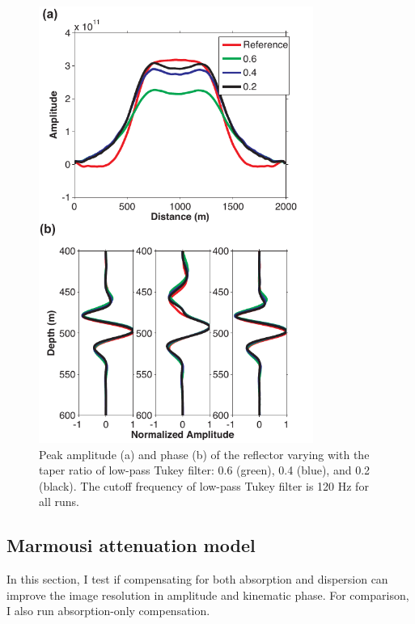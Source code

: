  \begin{figure}[!htb]
   \centering
   \includegraphics[width=0.8\textwidth]{Fig/fig8-eps-converted-to}
   \caption{Peak amplitude (a) and phase (b) of the reflector varying with the taper ratio of low-pass Tukey filter: 0.6 (green), 0.4 (blue), and 0.2 (black). The cutoff frequency of low-pass Tukey filter is 120 Hz for all runs.}
 \end{figure}

\subsection{Marmousi attenuation model} 
In this section, I test if compensating for both absorption and dispersion can improve the image resolution in amplitude and kinematic phase. For comparison, I also run absorption-only compensation. 


